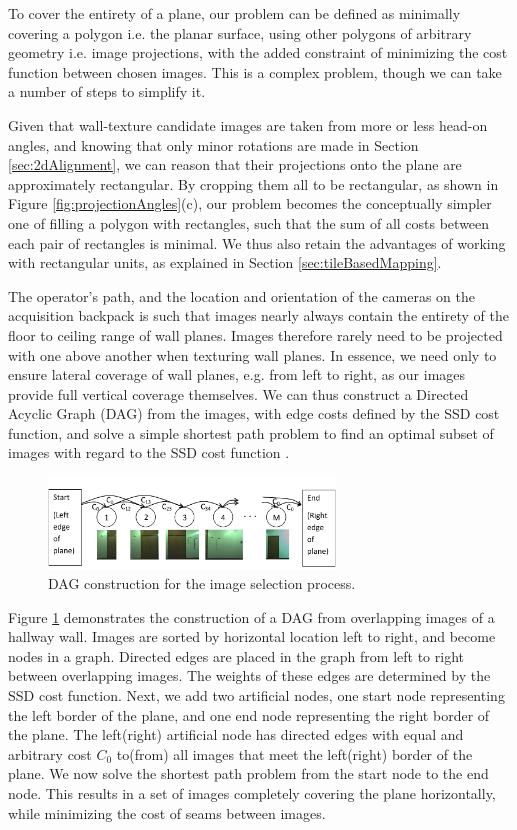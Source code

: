 \documentclass[]{spie}  %
\begin{document}
{To cover the entirety of a plane, our problem can be defined as
minimally covering a polygon i.e. the planar surface, using other
polygons of arbitrary geometry i.e. image projections, with the added
constraint of minimizing the cost function between chosen images.
This is a complex problem, though we can take a number of steps to
simplify it.

Given that wall-texture candidate images are taken from more or less
head-on angles, and knowing that only minor rotations are made in
Section \ref{sec:2dAlignment}, we can reason that their projections
onto the plane are approximately rectangular. By cropping them all to
be rectangular, as shown in Figure \ref{fig:projectionAngles}(c), our
problem becomes the conceptually simpler one of filling a polygon with
rectangles, such that the sum of all costs between each pair of
rectangles is minimal. We thus also retain the advantages of working
with rectangular units, as explained in Section
\ref{sec:tileBasedMapping}.

The operator's path, and the location and orientation of the cameras
on the acquisition backpack is such that images nearly always contain
the entirety of the floor to ceiling range of wall planes. Images
therefore rarely need to be projected with one above another when
texturing wall planes. In essence, we need only to ensure lateral
coverage of wall planes, e.g. from left to right, as our images
provide full vertical coverage themselves. We can thus construct a
Directed Acyclic Graph (DAG) from the images, with edge costs defined
by the SSD cost function, and solve a simple shortest path problem to
find an optimal subset of images with regard to the SSD cost function
\cite{dijkstra}.

\begin{figure}
  \centering
  \includegraphics[width=3in]{dagCreation.pdf}
  \caption{DAG construction for the image selection process. \\}
  \label{fig:dagCreation}
\end{figure}

Figure \ref{fig:dagCreation} demonstrates the construction of a DAG
from overlapping images of a hallway wall. Images are sorted by
horizontal location left to right, and become nodes in a
graph. Directed edges are placed in the graph from left to right
between overlapping images. The weights of these edges are determined
by the SSD cost function. Next, we add two artificial nodes, one start
node representing the left border of the plane, and one end node
representing the right border of the plane. The left(right) artificial
node has directed edges with equal and arbitrary cost $C_0$ to(from)
all images that meet the left(right) border of the plane. We now solve
the shortest path problem from the start node to the end node. This
results in a set of images completely covering the plane horizontally,
while minimizing the cost of seams between images.

}
\end{document}
